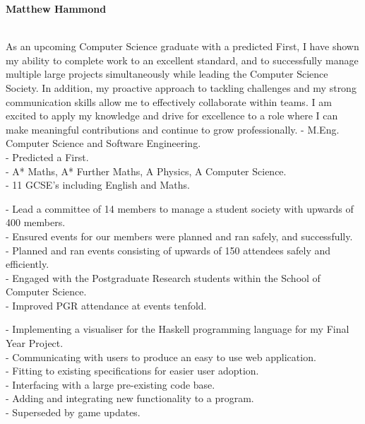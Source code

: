 \documentclass[twoside]{article}
\begin{document}
\selectfont
\begin{center}
    \noindent\huge\textbf{Matthew Hammond}
\end{center}\hr
{}
\hfill
{}\\
\hfill
{}\hr
As an upcoming Computer Science graduate with a predicted First, I have shown my ability to complete work to an excellent standard, and to successfully manage multiple large projects simultaneously while leading the Computer Science Society. In addition, my proactive approach to tackling challenges and my strong communication skills allow me to effectively collaborate within teams. I am excited to apply my knowledge and drive for excellence to a role where I can make meaningful contributions and continue to grow professionally.
- M.Eng. Computer Science and Software Engineering.\\
- Predicted a First.\vspace{2pt}\\
- A* Maths, A* Further Maths, A Physics, A Computer Science.\vspace{2pt}\\
- 11 GCSE's including English and Maths.

- Lead a committee of 14 members to manage a student society with upwards of 400 members.\\
- Ensured events for our members were planned and ran safely, and successfully.\\
- Planned and ran events consisting of upwards of 150 attendees safely and efficiently.\\
- Engaged with the Postgraduate Research students within the School of Computer Science.\\
- Improved PGR attendance at events tenfold.

- Implementing a visualiser for the Haskell programming language for my Final Year Project.\\
- Communicating with users to produce an easy to use web application.\\
- Fitting to existing specifications for easier user adoption.\\
- Interfacing with a large pre-existing code base.\\
- Adding and integrating new functionality to a program.\\
- Superseded by game updates.
\end{document}
